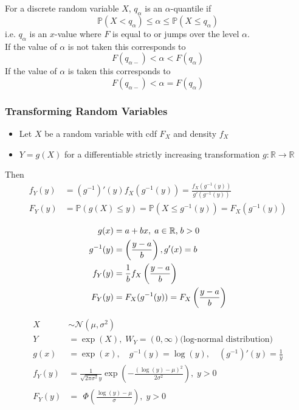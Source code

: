 For a discrete random variable $X$, $q_\alpha$ is an $\alpha$-quantile if
\begin{equation*}
    \mathbb{P}(X<q_\alpha)\le\alpha\le\mathbb{P}(X\le q_\alpha)
\end{equation*}
i.e. $q_\alpha$ is an $x$-value where $F$ is equal to or jumps over the level $\alpha$.\\
If the value of $\alpha$ is not taken this corresponds to
\begin{equation*}
    F(q_{\alpha-})< \alpha < F(q_{\alpha})
\end{equation*}
If the value of $\alpha$ is taken this corresponds to
\begin{equation*}
    F(q_{\alpha-})< \alpha = F(q_{\alpha})
\end{equation*}

\subsubsection{Transforming Random Variables}
\begin{itemize}
    \item Let $X$ be a random variable with cdf $F_X$ and density $f_X$
    \item $Y=g(X)$ for a differentiable strictly increasing transformation $g:\mathbb{R}\to\mathbb{R}$
\end{itemize}
Then
\begin{align*}
    f_Y(y)   & =(g^{-1})'(y)f_X(g^{-1}(y))=\frac{f_X(g^{-1}(y))}{g'(g^{-1}(y))}     \\
    F_{Y}(y) & =\mathbb{P}(g(X)\leq y)=\mathbb{P}(X\leq g^{-1}(y))=F_{X}(g^{-1}(y))
\end{align*}

\begin{align*}
    g(x)      & =a+bx,\;a\in\mathbb{R}\text,\;b>0           \\
    g^{-1}(y) & =\left(\frac{y-a}b\right), g'(x)=b          \\
    f_Y(y)    & =\frac1bf_X\left(\frac{y-a}b\right)         \\
    F_Y(y)    & =F_X(g^{-1}(y))=F_X\left(\frac{y-a}b\right)
\end{align*}

\begin{align*}
    X      & \sim\mathcal{N}(\mu,\sigma^2)                                                              \\
    Y      & =\exp(X),\;W_Y=(0,\infty) \text{(log-normal distribution)}                                 \\
    g(x)   & =\exp(x),\quad g^{-1}(y)=\log(y),\quad(g^{-1})'(y)=\frac{1}{y}                             \\
    f_Y(y) & =\frac{1}{\sqrt{2\pi\sigma^2}y}\exp\left(-\frac{{(\log(y)-\mu)}^2}{2\sigma^2}\right),\;y>0 \\
    F_Y(y) & =\begin{aligned}\Phi\left(\frac{\log(y)-\mu}\sigma\right),\;y>0\end{aligned}
\end{align*}

